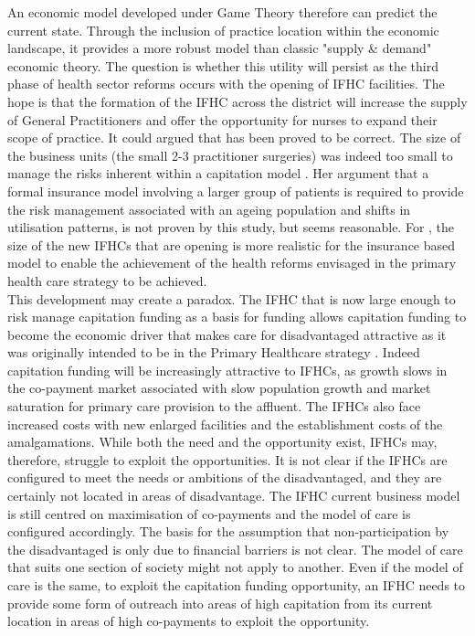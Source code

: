 \documentclass[11pt,a4paper]{article}
\begin{document}
An economic model developed under Game Theory therefore can predict the current state. Through the inclusion of practice location within the economic landscape, it provides a more robust model than classic "supply \& demand" economic theory. The question is whether this utility will persist as the third phase of health sector reforms occurs with the opening of IFHC facilities. The hope is that the formation of the IFHC across the district will increase the supply of General Practitioners and offer the opportunity for nurses to expand their scope of practice. It could argued that\citet{howell2005restructuring} has been proved to be correct. The size of the business units (the small 2-3 practitioner surgeries) was indeed too small to manage the risks inherent within a capitation model \citep{howell2005restructuring}. Her argument that a formal insurance model involving a larger group of patients is required to provide the risk management associated with an ageing population and shifts in utilisation patterns, is not proven by this study, but seems reasonable. For \citet{howell2005restructuring}, the size of the new IFHCs that are opening is more realistic for the insurance based model to enable the achievement of the health reforms envisaged in the primary health care strategy to be achieved.\\


This development may create a paradox. The IFHC that is now large enough to risk manage capitation funding as a basis for funding allows capitation funding to become the economic driver that makes care for disadvantaged attractive as it was originally intended to be in the Primary Healthcare strategy \citep{king2001primary}. Indeed capitation funding will be increasingly attractive to IFHCs, as growth slows in the co-payment market associated with slow population growth and market saturation for primary care provision to the affluent. The IFHCs also face increased costs with new enlarged facilities and the establishment costs of the amalgamations. While both the need and the opportunity exist, IFHCs may, therefore, struggle to exploit the opportunities. It is not clear if the IFHCs are configured to meet the needs or ambitions of the disadvantaged, and they are certainly not located in areas of disadvantage. The IFHC current business model is still centred on maximisation of co-payments and the model of care is configured accordingly. The basis for the assumption that non-participation by the disadvantaged is only due to financial barriers is not clear. The model of care that suits one section of society might not apply to another. Even if the model of care is the same, to exploit the capitation funding opportunity, an IFHC needs to provide some form of outreach into areas of high capitation from its current location in areas of high co-payments to exploit the opportunity.\\
\end{document}
